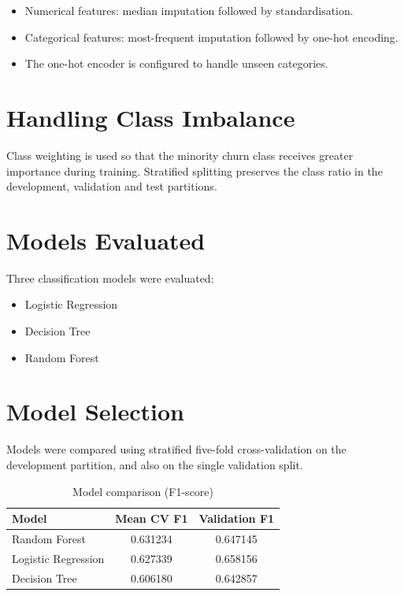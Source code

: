 \documentclass[12pt,a4paper]{report}
\begin{document}
\begin{itemize}
\item Numerical features: median imputation followed by standardisation.
\item Categorical features: most-frequent imputation followed by one-hot encoding.
\item The one-hot encoder is configured to handle unseen categories.
\end{itemize}

\section{Handling Class Imbalance}

Class weighting is used so that the minority churn class receives greater importance during training. Stratified splitting preserves the class ratio in the development, validation and test partitions.

\section{Models Evaluated}

Three classification models were evaluated:

\begin{itemize}
\item Logistic Regression
\item Decision Tree
\item Random Forest
\end{itemize}

\section{Model Selection}

Models were compared using stratified five-fold cross-validation on the development partition, and also on the single validation split.

\begin{table}[!htbp]
\centering
\caption{Model comparison (F1-score)}
\begin{tabular}{lcc}
\toprule
\textbf{Model} & \textbf{Mean CV F1} & \textbf{Validation F1} \\
\midrule
Random Forest & 0.631234 & 0.647145 \\
Logistic Regression & 0.627339 & 0.658156 \\
Decision Tree & 0.606180 & 0.642857 \\
\bottomrule
\end{tabular}
\label{tab:model_comparison}
\end{table}
\end{document}
